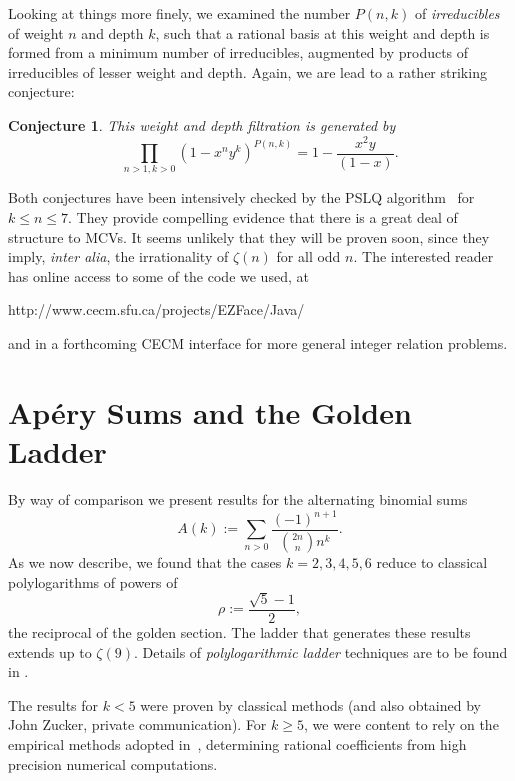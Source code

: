 \documentclass[a4paper,a4paper]{article}
\newtheorem{Conj}{Conjecture}
\begin{document}
Looking at things more finely, we examined the number $P(n,k)$
of {\em irreducibles} of weight $n$ and depth $k$, such that
a rational basis at this weight and depth is formed from
a minimum number of irreducibles,
augmented by products of irreducibles of lesser
weight and depth. Again, we are lead to a rather striking
conjecture:

\begin{Conj}
This weight and depth filtration is generated by
$$
\prod_{n > 1, k > 0} (1-x^ny^k)^{P(n,k)} = 1- \frac{x^2y}{(1-x)}.
$$
\end{Conj}

Both conjectures have been intensively
checked by the PSLQ algorithm~\cite{DHJB1}
for $k\leq n\leq 7$. They provide
compelling evidence     that there
 is a great deal of structure to MCVs.
 It seems unlikely that they will be proven soon, since they
 imply, {\sl inter alia}, the irrationality of $ \zeta(n) $
 for    all odd $ n $.
The interested reader has online access to some of the  code we used,
at

\vspace{\baselineskip}

\centerline{http://www.cecm.sfu.ca/projects/EZFace/Java/
}

\vspace{\baselineskip}

\noindent
and in a forthcoming CECM interface for more general integer relation problems.

\section{
Ap\'ery Sums and
the Golden Ladder}

By way of comparison we present results for the alternating binomial
sums
$$A(k):=\sum_{n>0}\frac{(-1)^{n+1}}{{2n\choose n}n^k}.$$
As we now describe, we found that the cases $k=2, 3, 4, 5, 6$
reduce to classical polylogarithms  of  powers of
$$\rho:=\frac{\sqrt5-1}2,$$   the reciprocal
of the golden section.
The ladder that generates these results
extends up to $\zeta(9)$.
Details of {\em polylogarithmic ladder} techniques are to be found in
\cite{L2}.

 The results for $k<5$ were proven by classical methods
(and also obtained by John Zucker, private communication). For $k\ge5$,
we were content to rely on the empirical methods adopted in~\cite{L2},
determining rational coefficients from
high precision numerical computations.
\vspace{\baselineskip}
\end{document}
